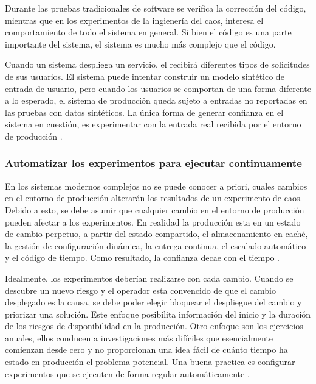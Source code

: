 \par Durante las pruebas tradicionales de software se verifica la corrección del código, mientras que en los experimentos de la ingienería del caos, interesa el comportamiento de todo el sistema en general. Si bien el código es una parte importante del sistema, el sistema es mucho más complejo que el código.\\

\par Cuando un sistema despliega un servicio, el recibirá  diferentes tipos de solicitudes de sus usuarios.  El sistema puede intentar construir un modelo sintético de entrada de usuario, pero cuando los usuarios se comportan de una forma diferente a lo esperado, el sistema de producción queda sujeto a entradas no reportadas en las pruebas con datos sintéticos. La única forma de generar confianza en el sistema en cuestión, es experimentar con la entrada real recibida por el entorno de producción \cite{LIB06}.

\subsubsection{Automatizar los experimentos para ejecutar continuamente}

\par En los sistemas modernos complejos no se puede conocer a priori, cuales cambios en el entorno de producción alterarán los resultados de un experimento de caos. Debido a esto, se debe asumir que cualquier cambio en el entorno de producción pueden afectar a los experimentos. En realidad la producción esta en un estado de cambio perpetuo, a partir del estado compartido, el almacenamiento en caché, la gestión de configuración dinámica, la entrega continua, el escalado automático y el código de tiempo. Como resultado, la confianza decae con el tiempo \cite{LIB06}.\\

\par Idealmente, los experimentos deberían realizarse con cada cambio. Cuando se descubre un nuevo riesgo y el operador esta convencido de que el cambio desplegado es la causa, se debe poder elegir bloquear el despliegue del cambio y priorizar una solución. Este enfoque posibilita información del inicio y la duración de los riesgos de disponibilidad en la producción. Otro enfoque son los ejercicios anuales, ellos conducen a investigaciones más difíciles que esencialmente comienzan desde cero y no proporcionan una idea fácil de cuánto tiempo ha estado en producción el problema potencial. Una buena practica es configurar experimentos que se ejecuten de forma regular automáticamente \cite{LIB06}.


